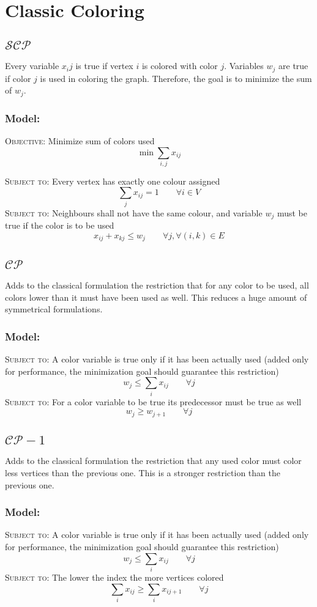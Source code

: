 \documentclass[a4paper]{article}
\newenvironment{lpmodel}{\subsubsection*{Model:} }{ }
\newcommand{\lpobjective}[2]{\textsc{Objective:} #1 \[ #2 \]}
\newcommand{\lprestriction}[3]{\textsc{Subject to:} #1 \[ #2 \qquad #3 \]}
\begin{document}
\section{Classic Coloring}

\subsection{$\mathcal{SCP}$}

Every variable $x_ij$ is true if vertex $i$ is colored with color $j$. Variables $w_j$ are true if color $j$ is used in coloring the graph. Therefore, the goal is to minimize the sum of $w_j$.

\begin{lpmodel}
\lpobjective{Minimize sum of colors used}
{\min \sum _{i,j} x_{ij}}

\lprestriction{Every vertex has exactly one colour assigned}
{\sum _j x_{ij} = 1}{\forall i \in V}
\lprestriction{Neighbours shall not have the same colour, and variable $w_j$ must be true if the color is to be used}
{x_{ij} + x_{kj} \leq w_j}{\forall j, \forall (i,k) \in E}
\end{lpmodel}

\subsection{$\mathcal{CP}$}

Adds to the classical formulation the restriction that for any color to be used, all colors lower than it must have been used as well. This reduces a huge amount of symmetrical formulations.

\begin{lpmodel}
\lprestriction{A color variable is true only if it has been actually used (added only for performance, the minimization goal should guarantee this restriction)}
{w_j \leq \sum _i x_{ij}}{\forall j}
\lprestriction{For a color variable to be true its predecessor must be true as well}
{w_j \geq w_{j+1}}{\forall j}
\end{lpmodel}

\subsection{$\mathcal{CP}-1$}

Adds to the classical formulation the restriction that any used color must color less vertices than the previous one. This is a stronger restriction than the previous one.

\begin{lpmodel}
\lprestriction{A color variable is true only if it has been actually used (added only for performance, the minimization goal should guarantee this restriction)}
{w_j \leq \sum _i x_{ij}}{\forall j}
\lprestriction{The lower the index the more vertices colored}
{\sum _i x_{ij} \geq \sum _i x_{ij+1}}{\forall j}
\end{lpmodel}
\end{document}
